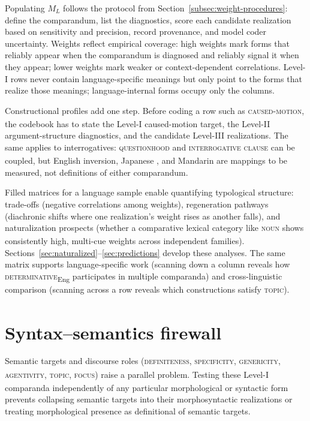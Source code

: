 \documentclass[12pt]{article}
\begin{document}
Populating $M_L$ follows the protocol from Section~\ref{subsec:weight-procedures}: define the comparandum, list the diagnostics, score each candidate realization based on sensitivity and precision, record provenance, and model coder uncertainty. Weights reflect empirical coverage: high weights mark forms that reliably appear when the comparandum is diagnosed and reliably signal it when they appear; lower weights mark weaker or context-dependent correlations. Level-I rows never contain language-specific meanings but only point to the forms that realize those meanings; language-internal forms occupy only the columns.

Constructional profiles add one step. Before coding a row such as \textsc{caused-motion}\textsubscript{\Cross}, the codebook has to state the Level-I caused-motion target, the Level-II argument-structure diagnostics, and the candidate Level-III realizations. The same applies to interrogatives: \textsc{questionhood}\textsubscript{\Cross} and \textsc{interrogative clause}\textsubscript{\Cross} can be coupled, but English inversion, Japanese , and Mandarin  are mappings to be measured, not definitions of either comparandum.

Filled matrices for a language sample enable quantifying typological structure: trade-offs (negative correlations among weights), regeneration pathways (diachronic shifts where one realization's weight rises as another falls), and naturalization prospects (whether a comparative lexical category like \textsc{noun}\textsubscript{\Cross} shows consistently high, multi-cue weights across independent families). Sections~\ref{sec:naturalized}--\ref{sec:predictions} develop these analyses. The same matrix supports language-specific work (scanning down a column reveals how \textsc{determinative}\textsubscript{Eng} participates in multiple comparanda) and cross-linguistic comparison (scanning across a row reveals which constructions satisfy \textsc{topic}\textsubscript{\Cross}).


\section{Syntax--semantics firewall}\label{sec:firewall}

Semantic targets and discourse roles (\textsc{definiteness}\textsubscript{\Cross}, \textsc{specificity}\textsubscript{\Cross}, \textsc{genericity}\textsubscript{\Cross}, \textsc{agentivity}\textsubscript{\Cross}, \textsc{topic}\textsubscript{\Cross}, \textsc{focus}\textsubscript{\Cross}) raise a parallel problem. Testing these Level-I comparanda independently of any particular morphological or syntactic form prevents collapsing semantic targets into their morphosyntactic realizations or treating morphological presence as definitional of semantic targets.
\end{document}
